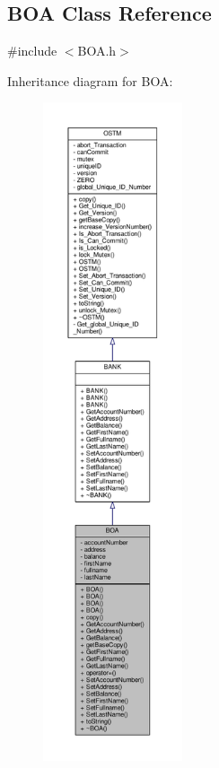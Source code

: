 \hypertarget{class_b_o_a}{}\subsection{B\+OA Class Reference}
\label{class_b_o_a}


{\ttfamily \#include $<$B\+O\+A.\+h$>$}



Inheritance diagram for B\+OA\+:\nopagebreak
\begin{figure}[H]
\begin{center}
\leavevmode
\includegraphics[height=550pt]{class_b_o_a__inherit__graph}
\end{center}
\end{figure}


